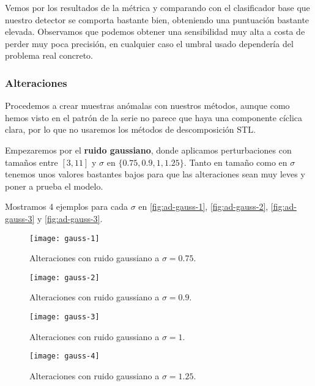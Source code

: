 Vemos por los resultados de la métrica y comparando con el clasificador base que nuestro detector se comporta bastante bien, obteniendo una puntuación bastante elevada. Observamos que podemos obtener una sensibilidad muy alta a costa de perder muy poca precisión, en cualquier caso el umbral usado dependería del problema real concreto.

\subsubsection{Alteraciones}

Procedemos a crear muestras anómalas con nuestros métodos, aunque como hemos visto en el patrón de la serie no parece que haya una componente cíclica clara, por lo que no usaremos los métodos de descomposición STL.

Empezaremos por el \textbf{ruido gaussiano}, donde aplicamos perturbaciones con tamaños entre $[3, 11]$ y $\sigma$ en $\{0.75, 0.9, 1, 1.25\}$. Tanto en tamaño como en $\sigma$ tenemos unos valores bastantes bajos para que las alteraciones sean muy leves y poner a prueba el modelo.

Mostramos 4 ejemplos para cada $\sigma$ en \autoref{fig:ad-gauss-1}, \autoref{fig:ad-gauss-2}, \autoref{fig:ad-gauss-3} y \autoref{fig:ad-gauss-3}.

\begin{figure}[htpb]
  \centering
  \texttt{[image: gauss-1]}
  \caption{Alteraciones con ruido gaussiano a $\sigma = 0.75$.}
  \label{fig:ad-gauss-1}
\end{figure}

\begin{figure}[htpb]
  \centering
  \texttt{[image: gauss-2]}
  \caption{Alteraciones con ruido gaussiano a $\sigma = 0.9$.}
  \label{fig:ad-gauss-2}
\end{figure}

\begin{figure}[htpb]
  \centering
  \texttt{[image: gauss-3]}
  \caption{Alteraciones con ruido gaussiano a $\sigma = 1$.}
  \label{fig:ad-gauss-3}
\end{figure}

\begin{figure}[htpb]
  \centering
  \texttt{[image: gauss-4]}
  \caption{Alteraciones con ruido gaussiano a $\sigma = 1.25$.}
  \label{fig:ad-gauss-4}
\end{figure}

